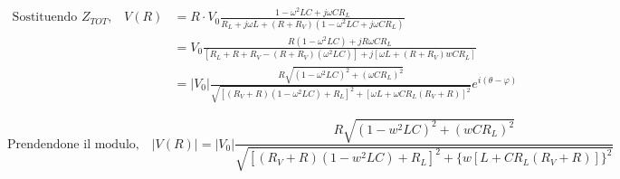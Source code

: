 \documentclass[12pt]{article}
\numberwithin{equation}{section}
\begin{document}
\begin{equation}
\begin{split}
    \text{Sostituendo $Z_{TOT}$,}  \quad
    V(R) & = R \cdot V_0 \frac{1-\omega ^2 L C + j \omega C R_L}{R_L + j \omega L + (R + R_V)(1 - \omega ^2 L C + j \omega C R_L)} \\
    & = V_0 \frac{R(1-\omega ^2 L C) + j R \omega C R_L}{[R_L + R + R_V -(R + R_V)(\omega ^2 L C)] + j [\omega L + (R + R_V) w C R_L]} \\
    & = |V_0| \frac{R \sqrt{(1-\omega ^2 L C)^2 + (\omega C R_L)^2}}{\sqrt{[(R_V + R) (1 - \omega ^2 L C ) + R_L]^2 + [\omega L + \omega C R_L ( R_V + R)]^2}} e^{i(\theta-\varphi)}
\end{split}
\end{equation}

\begin{equation}
    \text{Prendendone il modulo,} \quad
    |V(R)| =  |V_{0}| \frac{R \sqrt{(1-w^2LC)^2+(wCR_{L})^2}}{\sqrt{[(R_{V}+R)(1-w^2LC)+R_{L}]^2+\{w[L+CR_{L}(R_{V}+R)]\}^2}}
\end{equation}
\end{document}
